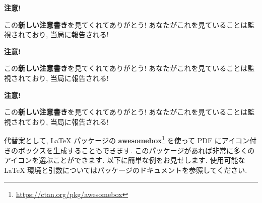 \documentclass[
  11pt,
  lualatex,ja=standard,jafont=noto]{bxjsreport}
\newenvironment{infobox}[1]{\begin{itemize}\renewcommand{\labelitemi}{\raisebox{-.7\height}[0pt][0pt]{%
  {\setkeys{Gin}{width=3em,keepaspectratio}\texttt{[image: \_latex/\_img/\#1]}}}}
  \setlength{\fboxsep}{1em}
  \begin{greyblock}
  \item
  }{\end{greyblock}\end{itemize}
}
\renewcommand{\href}[2]{#2\footnote{\url{#1}}}
\begin{document}
\begin{infobox}{memo}
\textbf{注意!}

この\textbf{新しい注意書き}を見てくれてありがとう! あなたがこれを見ていることは監視されており, 当局に報告される!

\end{infobox}

\begin{infobox}{important}
\textbf{注意!}

この\textbf{新しい注意書き}を見てくれてありがとう! あなたがこれを見ていることは監視されており, 当局に報告される!

\end{infobox}

\begin{infobox}{tip}
\textbf{注意!}

この\textbf{新しい注意書き}を見てくれてありがとう! あなたがこれを見ていることは監視されており, 当局に報告される!

\end{infobox}

代替案として, LaTeX パッケージの \href{https://ctan.org/pkg/awesomebox}{\textbf{awesomebox}} を使って PDF にアイコン付きのボックスを生成することもできます. このパッケージがあれば非常に多くのアイコンを選ぶことができます. 以下に簡単な例をお見せします. 使用可能な LaTeX 環境と引数についてはパッケージのドキュメントを参照してください.
\end{document}
